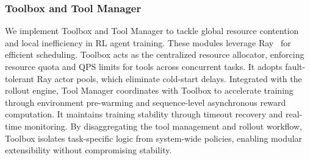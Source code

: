 \subsubsection{Toolbox and Tool Manager}
\label{sec:posttrain:rlinfra:tool}

We implement Toolbox and Tool Manager to tackle global resource contention and local inefficiency in RL agent training.
%
These modules leverage Ray~\citep{moritz2018ray} for efficient scheduling.
%
Toolbox acts as the centralized resource allocator, enforcing resource quota and QPS limits for tools across concurrent tasks.
%
It adopts fault-tolerant Ray actor pools, which eliminate cold-start delays.
%
Integrated with the rollout engine, Tool Manager coordinates with Toolbox to accelerate training through environment pre-warming and sequence-level asynchronous reward computation.
%
It maintains training stability through timeout recovery and real-time monitoring.
%
By disaggregating the tool management and rollout workflow, Toolbox isolates task-specific logic from system-wide policies, enabling modular extensibility without compromising stability.



